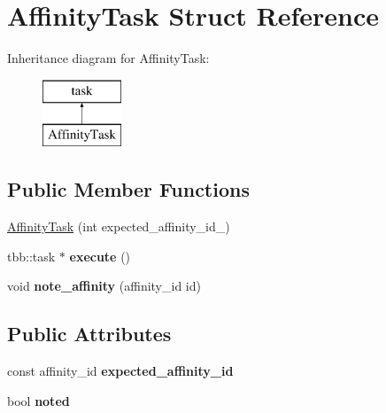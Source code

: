 \hypertarget{structAffinityTask}{}\section{Affinity\+Task Struct Reference}
\label{structAffinityTask}
Inheritance diagram for Affinity\+Task\+:\begin{figure}[H]
\begin{center}
\leavevmode
\includegraphics[height=2.000000cm]{structAffinityTask}
\end{center}
\end{figure}
\subsection*{Public Member Functions}
\begin{DoxyCompactItemize}
\item 
\hyperlink{structAffinityTask_a3ba0584242ca730b67aa793ee431ee38}{Affinity\+Task} (int expected\+\_\+affinity\+\_\+id\+\_\+)
\item 
\hypertarget{structAffinityTask_ae6216397790f0ee56575c9b706695817}{}tbb\+::task $\ast$ {\bfseries execute} ()\label{structAffinityTask_ae6216397790f0ee56575c9b706695817}

\item 
\hypertarget{structAffinityTask_a5ae29d917f5f148f9334685587f63b8b}{}void {\bfseries note\+\_\+affinity} (affinity\+\_\+id id)\label{structAffinityTask_a5ae29d917f5f148f9334685587f63b8b}

\end{DoxyCompactItemize}
\subsection*{Public Attributes}
\begin{DoxyCompactItemize}
\item 
\hypertarget{structAffinityTask_a4ffedb6195db9814ff7926912bba3b4a}{}const affinity\+\_\+id {\bfseries expected\+\_\+affinity\+\_\+id}\label{structAffinityTask_a4ffedb6195db9814ff7926912bba3b4a}

\item 
\hypertarget{structAffinityTask_a5fb500dfa31e3ab7949e52c7f8b40251}{}bool {\bfseries noted}\label{structAffinityTask_a5fb500dfa31e3ab7949e52c7f8b40251}

\end{DoxyCompactItemize}


